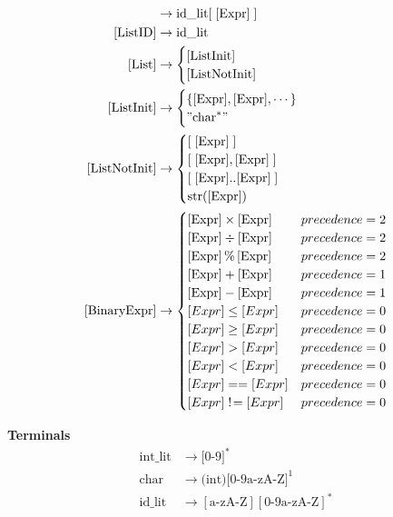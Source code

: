 \documentclass[11pt]{article}
\begin{document}
\begin{align*}
  [\text{ListLocation}] &\to \text{id\_lit}[ \; [\text{Expr}] \; ]\\
  [\text{ListID}] &\to \text{id\_lit} \\
  [\text{List}] &\to 
  \begin{cases}
  [\text{ListInit}] \\
  [\text{ListNotInit}] \\
  \end{cases} \\
  [\text{ListInit}] &\to 
  \begin{cases}
    \{[\text{Expr}], [\text{Expr}], \cdots \} \\
    "\text{char}^*" \\ 
  \end{cases} \\
  [\text{ListNotInit}] &\to 
  \begin{cases}
    [\; [\text{Expr}] \;] \\
    [\; [\text{Expr}], [\text{Expr}] \;] \\
    [\; [\text{Expr}]..[\text{Expr}] \;] \\
    \text{str([Expr])} \\
  \end{cases} \\
  [\text{BinaryExpr}] &\to 
  \begin{cases}
    [\text{Expr}] \times [\text{Expr}] & precedence = 2 \\
    [\text{Expr}] \div [\text{Expr}] & precedence = 2 \\
    [\text{Expr}] \,\%\, [\text{Expr}] & precedence = 2 \\
    [\text{Expr}] + [\text{Expr}] & precedence = 1 \\
    [\text{Expr}] - [\text{Expr}] & precedence = 1 \\
    [Expr] \le  [Expr] & precedence = 0 \\
    [Expr] \ge  [Expr] & precedence = 0 \\
    [Expr] >  [Expr] & precedence = 0 \\
    [Expr] <  [Expr] & precedence = 0 \\
    [Expr] ==  [Expr] & precedence = 0 \\
    [Expr] \; ! \!=  [Expr] & precedence = 0 \\
  \end{cases} \\
\end{align*}


\textbf{Terminals}
\begin{align*}
  \text{int\_lit} &\to \text{[0-9]}^* \\
  \text{char} &\to \text{(int)[0-9a-zA-Z]}^1 \\
  \text{id\_lit} &\to [\text{a-zA-Z}][\text{0-9a-zA-Z}]^* \\
\end{align*}
\end{document}
